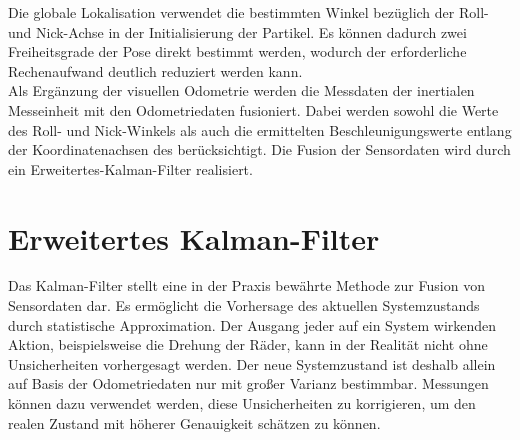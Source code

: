Die globale Lokalisation verwendet die bestimmten Winkel bezüglich der Roll- und Nick-Achse in der Initialisierung der Partikel. Es können dadurch zwei Freiheitsgrade der Pose direkt bestimmt werden, wodurch der erforderliche Rechenaufwand deutlich reduziert werden kann.\\

Als Ergänzung der visuellen Odometrie werden die Messdaten der inertialen Messeinheit mit den Odometriedaten fusioniert. Dabei werden sowohl die Werte des Roll- und Nick-Winkels als auch die ermittelten Beschleunigungswerte entlang der Koordinatenachsen des  berücksichtigt. Die Fusion der Sensordaten wird durch ein Erweitertes-Kalman-Filter realisiert.

\prever{
}
\section{Erweitertes Kalman-Filter}
\label{chap.kalman}
Das Kalman-Filter \cite{Kalman1960} stellt eine in der Praxis bewährte Methode zur Fusion von Sensordaten dar. Es ermöglicht die Vorhersage des aktuellen Systemzustands durch statistische Approximation. Der Ausgang jeder auf ein System wirkenden Aktion, beispielsweise die Drehung der Räder, kann in der Realität nicht ohne Unsicherheiten vorhergesagt werden. Der neue Systemzustand ist deshalb allein auf Basis der Odometriedaten nur mit großer Varianz bestimmbar. Messungen können dazu verwendet werden, diese Unsicherheiten zu korrigieren, um den realen Zustand mit höherer Genauigkeit schätzen zu können.\\

